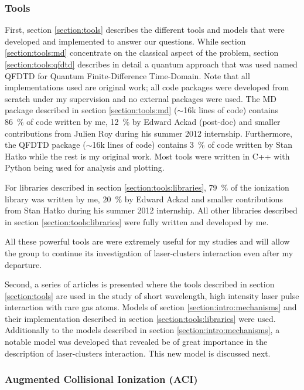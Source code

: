 \subsubsection{Tools}

First, section \ref{section:tools} describes the different tools and models
that were developed and implemented to answer our questions. While section
\ref{section:tools:md} concentrate on the classical aspect of the problem,
section \ref{section:tools:qfdtd} describes in detail a quantum approach that
was used named QFDTD for Quantum Finite-Difference Time-Domain.
Note that all implementations used are original work; all code packages
were developed from scratch under my supervision and no external packages
were used. The MD package described in
section \ref{section:tools:md} ($\sim$16k lines of code) contains 86~\% of code
written by me, 12~\% by Edward Ackad (post-doc) and smaller contributions from
Julien Roy during his summer 2012 internship. Furthermore, the QFDTD package
($\sim$16k lines of code) contains 3~\% of code written by Stan Hatko while the
rest is my original work. Most tools were written in C++ with Python being used
for analysis and plotting.

For libraries described in section \ref{section:tools:libraries}, 79~\% of the
ionization library was written by me, 20~\% by Edward Ackad and smaller
contributions from Stan Hatko during his summer 2012 internship. All other
libraries described in section \ref{section:tools:libraries} were fully
written and developed by me.

All these powerful tools are were extremely useful for my studies and will allow
the group to continue its investigation of laser-clusters interaction even
after my departure.

Second, a series of articles is presented where the tools described in section
\ref{section:tools} are used in the study of short wavelength, high intensity
laser pulse interaction with rare gas atoms. Models of section
\ref{section:intro:mechanisms} and their implementation described in section
\ref{section:tools:libraries} were used. Additionally to the models described in
section \ref{section:intro:mechanisms}, a notable model was
developed that revealed be of great importance in the description of
laser-clusters interaction. This new model is discussed next.


\subsubsection{Augmented Collisional Ionization (ACI)}

